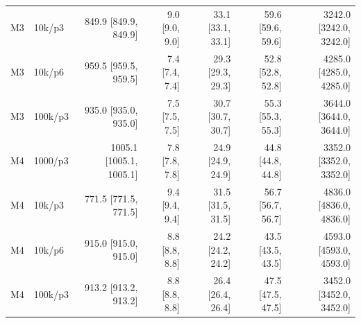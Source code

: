 \begin{table}[htbp]
\begin{tabular}{llrrrrr}
M3 & 10k/p3 & 849.9 [849.9, 849.9] & 9.0 [9.0, 9.0] & 33.1 [33.1, 33.1] & 59.6 [59.6, 59.6] & 3242.0 [3242.0, 3242.0] \\
M3 & 10k/p6 & 959.5 [959.5, 959.5] & 7.4 [7.4, 7.4] & 29.3 [29.3, 29.3] & 52.8 [52.8, 52.8] & 4285.0 [4285.0, 4285.0] \\
M3 & 100k/p3 & 935.0 [935.0, 935.0] & 7.5 [7.5, 7.5] & 30.7 [30.7, 30.7] & 55.3 [55.3, 55.3] & 3644.0 [3644.0, 3644.0] \\
M4 & 1000/p3 & 1005.1 [1005.1, 1005.1] & 7.8 [7.8, 7.8] & 24.9 [24.9, 24.9] & 44.8 [44.8, 44.8] & 3352.0 [3352.0, 3352.0] \\
M4 & 10k/p3 & 771.5 [771.5, 771.5] & 9.4 [9.4, 9.4] & 31.5 [31.5, 31.5] & 56.7 [56.7, 56.7] & 4836.0 [4836.0, 4836.0] \\
M4 & 10k/p6 & 915.0 [915.0, 915.0] & 8.8 [8.8, 8.8] & 24.2 [24.2, 24.2] & 43.5 [43.5, 43.5] & 4593.0 [4593.0, 4593.0] \\
M4 & 100k/p3 & 913.2 [913.2, 913.2] & 8.8 [8.8, 8.8] & 26.4 [26.4, 26.4] & 47.5 [47.5, 47.5] & 3452.0 [3452.0, 3452.0] \\
\bottomrule
\end{tabular}
\end{table}
